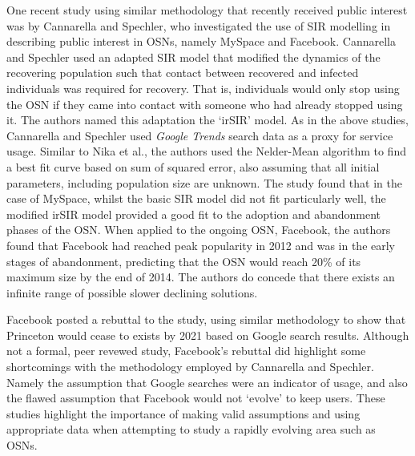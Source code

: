 \documentclass[11pt, a4paper, oneside,titlepage]{article}
\begin{document}
One recent study using similar methodology that recently received public interest was by Cannarella and Spechler, who investigated the use of SIR modelling in describing public interest in OSNs, namely MySpace and Facebook.\cite{cannarella} Cannarella and Spechler used an adapted SIR model that modified the dynamics of the recovering population such that contact between recovered and infected individuals was required for recovery.  That is, individuals would only stop using the OSN if they came into contact with someone who had already stopped using it. The authors named this adaptation the `irSIR' model. As in the above studies, Cannarella and Spechler used \emph{Google Trends} search data as a proxy for service usage. Similar to Nika et al., the authors used the Nelder-Mean algorithm to find a best fit curve based on sum of squared error, also assuming that all initial parameters, including population size are unknown. The study found that in the case of MySpace, whilst the basic SIR model did not fit particularly well, the modified irSIR model provided a good fit to the adoption and abandonment phases of the OSN. When applied to the ongoing OSN, Facebook, the authors found that Facebook had reached peak popularity in 2012 and was in the early stages of abandonment, predicting that the OSN would reach 20\% of its maximum size by the end of 2014. The authors do concede that there exists an infinite range of possible slower declining solutions. 

Facebook posted a rebuttal to the study, using similar methodology to show that Princeton would cease to exists by 2021 based on Google search results.\cite{facebook} Although not a formal, peer revewed study, Facebook's rebuttal did highlight some shortcomings with the methodology employed by Cannarella and Spechler. Namely the assumption that Google searches were an indicator of usage, and also the flawed assumption that Facebook would not `evolve' to keep users. These studies highlight the importance of making valid assumptions and using appropriate data when attempting to study a rapidly evolving area such as OSNs.
\end{document}
